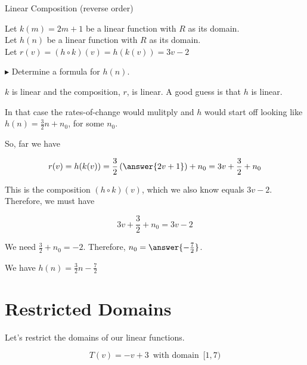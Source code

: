 \documentclass{ximera}
\begin{document}
\begin{example} Linear Composition (reverse order)

Let $k(m) = 2 m + 1$ be a linear function with \textbf{$R$} as its domain. \\
Let $h(n)$ be a linear function with \textbf{$R$} as its domain. \\


Let $r(v) = (h \circ k)(v) = h(k(v)) = 3 v - 2$ 

$\blacktriangleright$  Determine a formula for $h(n)$.




\begin{explanation}


$k$ is linear and the composition, $r$, is linear. A good guess is that $h$ is linear.  

In that case the rates-of-change would mulitply and $h$ would start off looking like $h(n) = \frac{3}{2} n + n_0$, for some $n_0$.


So, far we have 

\[   r(v) = h(k(v)) = \frac{3}{2} \left( \answer{2 v + 1} \right) + n_0 =  3 v + \frac{3}{2} + n_0\]


This is the composition $(h \circ k)(v)$, which we also know equals $3 v - 2$.  Therefore, we must have 

\[
3 v + \frac{3}{2} + n_0  = 3 v - 2
\]


We need $\frac{3}{2} + n_0 = -2$.  Therefore, $n_0 = \answer{-\frac{7}{2}}$.


We have $h(n) = \frac{3}{2} n - \frac{7}{2}$


\end{explanation}
\end{example}








\section{Restricted Domains}


Let's restrict the domains of our linear functions.









\[  T(v) = -v+3  \, \text{ with domain } \,  [1,7)   \]
\end{document}
